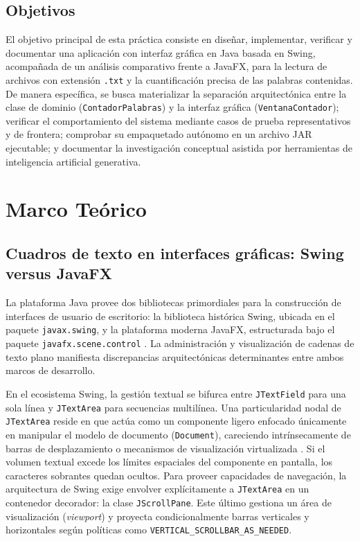 \documentclass[letterpaper,12pt,oneside]{article}
\numberwithin{figure}{section}
\begin{document}
\subsection{Objetivos}
El objetivo principal de esta práctica consiste en diseñar, implementar, verificar y documentar una aplicación con interfaz gráfica en Java basada en Swing, acompañada de un análisis comparativo frente a JavaFX, para la lectura de archivos con extensión \texttt{.txt} y la cuantificación precisa de las palabras contenidas. De manera específica, se busca materializar la separación arquitectónica entre la clase de dominio (\texttt{ContadorPalabras}) y la interfaz gráfica (\texttt{VentanaContador}); verificar el comportamiento del sistema mediante casos de prueba representativos y de frontera; comprobar su empaquetado autónomo en un archivo JAR ejecutable; y documentar la investigación conceptual asistida por herramientas de inteligencia artificial generativa.

\clearpage
\section{Marco Teórico}

\subsection{Cuadros de texto en interfaces gráficas: Swing versus JavaFX}
La plataforma Java provee dos bibliotecas primordiales para la construcción de interfaces de usuario de escritorio: la biblioteca histórica Swing, ubicada en el paquete \texttt{javax.\-swing}, y la plataforma moderna JavaFX, estructurada bajo el paquete \texttt{javafx.\-scene.\-control} \cite{gosling2023,oracleswing}. La administración y visualización de cadenas de texto plano manifiesta discrepancias arquitectónicas determinantes entre ambos marcos de desarrollo.

En el ecosistema Swing, la gestión textual se bifurca entre \texttt{JTextField} para una sola línea y \texttt{JTextArea} para secuencias multilínea. Una particularidad nodal de \texttt{JTextArea} reside en que actúa como un componente ligero enfocado únicamente en manipular el modelo de documento (\texttt{Document}), careciendo intrínsecamente de barras de desplazamiento o mecanismos de visualización virtualizada \cite{oracleswing}. Si el volumen textual excede los límites espaciales del componente en pantalla, los caracteres sobrantes quedan ocultos. Para proveer capacidades de navegación, la arquitectura de Swing exige envolver explícitamente a \texttt{JTextArea} en un contenedor decorador: la clase \texttt{JScrollPane}. Este último gestiona un área de visualización (\textit{viewport}) y proyecta condicionalmente barras verticales y horizontales según políticas como \texttt{VERTICAL\_SCROLLBAR\_AS\_NEEDED}.
\end{document}
